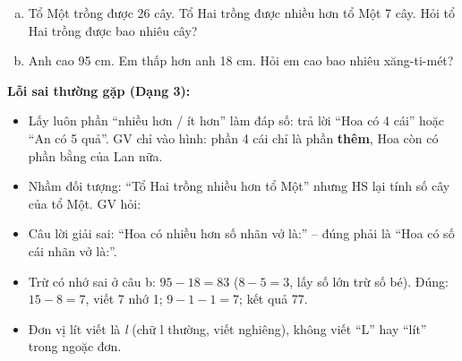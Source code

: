\documentclass[../main.tex]{subfiles}
\begin{document}
\begin{enumerate}[a)]
    \item Tổ Một trồng được 26 cây. Tổ Hai trồng được nhiều hơn tổ Một 7 cây. Hỏi tổ Hai trồng được bao nhiêu cây?
    \item Anh cao 95 cm. Em thấp hơn anh 18 cm. Hỏi em cao bao nhiêu xăng-ti-mét?
\end{enumerate}
\begin{luuy}
    \textbf{Lỗi sai thường gặp (Dạng 3):}
    \begin{itemize}
        \item Lấy luôn phần “nhiều hơn / ít hơn” làm đáp số: trả lời “Hoa có 4 cái” hoặc “An có 5 quả”. GV chỉ vào hình: phần 4 cái chỉ là phần \textbf{thêm}, Hoa còn có phần bằng của Lan nữa.
        \item Nhầm đối tượng: “Tổ Hai trồng nhiều hơn tổ Một” nhưng HS lại tính số cây của tổ Một. GV hỏi: 
        \item Câu lời giải sai: “Hoa có nhiều hơn số nhãn vở là:” -- đúng phải là “Hoa có số cái nhãn vở là:”.
        \item Trừ có nhớ sai ở câu b: $95 - 18 = 83$ ($8 - 5 = 3$, lấy số lớn trừ số bé). Đúng: $15 - 8 = 7$, viết 7 nhớ 1; $9 - 1 - 1 = 7$; kết quả 77.
        \item Đơn vị lít viết là \textit{l} (chữ l thường, viết nghiêng), không viết “L” hay “lít” trong ngoặc đơn.
    \end{itemize}
\end{luuy}

\newpage
\end{document}
